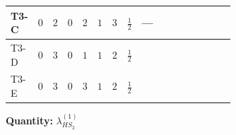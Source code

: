 \documentclass[8pt]{article}
\begin{document}
\begin{landscape}
\begin{longtable}{@{}llcccccc >{\raggedright\arraybackslash}p{0.21\linewidth} >{\raggedright\arraybackslash}p{0.21\linewidth} >{\raggedright\arraybackslash}p{0.21\linewidth}@{}}
\midrule
T3-C & $0$ & $2$ & $0$ & $2$ & $1$ & $3$ & $\frac{1}{2}$ & --- & \scriptsize\adjustbox{max width=\linewidth}{$\begin{gathered} +3 {g_1}^4\end{gathered}$} & \scriptsize\adjustbox{max width=\linewidth}{$\begin{gathered} -\frac{15 {g_1}^2 {\lambda_{HS_2}^{(1)}}}{2}\end{gathered}$} \\
\midrule
T3-D & $0$ & $3$ & $0$ & $1$ & $1$ & $2$ & $\frac{1}{2}$ & \scriptsize\adjustbox{max width=\linewidth}{$\begin{gathered} -\frac{9 {g_2}^2 {\lambda_{HS_2}^{(1)}}}{2}\end{gathered}$} & \scriptsize\adjustbox{max width=\linewidth}{$\begin{gathered} +3 {g_1}^4\end{gathered}$} & \scriptsize\adjustbox{max width=\linewidth}{$\begin{gathered} -\frac{15 {g_1}^2 {\lambda_{HS_2}^{(1)}}}{2}\end{gathered}$} \\
\midrule
T3-E & $0$ & $3$ & $0$ & $3$ & $1$ & $2$ & $\frac{1}{2}$ & \scriptsize\adjustbox{max width=\linewidth}{$\begin{gathered} -\frac{33 {g_2}^2 {\lambda_{HS_2}^{(1)}}}{2}\end{gathered}$} & \scriptsize\adjustbox{max width=\linewidth}{$\begin{gathered} +3 {g_1}^4\end{gathered}$} & \scriptsize\adjustbox{max width=\linewidth}{$\begin{gathered} -\frac{15 {g_1}^2 {\lambda_{HS_2}^{(1)}}}{2}\end{gathered}$} \\
\midrule
\bottomrule
\end{longtable}
\clearpage
\noindent\textbf{Quantity: }$\lambda_{HS_2}^{(1)}$\par\smallskip

\end{landscape}
\end{document}
